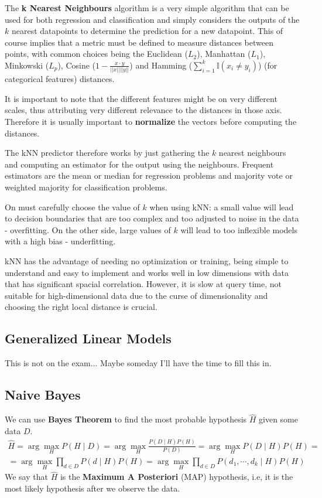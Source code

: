 \documentclass{article}
\begin{document}
The \textbf{k Nearest Neighbours} algorithm is a very simple algorithm that can be used for both regression and classification and simply considers the outputs of the $k$ nearest datapoints to determine the prediction for a new datapoint.
This of course implies that a metric must be defined to measure distances between points, with common choices being the Euclidean ($L_2$), Manhattan ($L_1$), Minkowski ($L_p$), Cosine ($1 - \frac{x \cdot y}{||x|| ||y||}$) and Hamming ($\sum_{i=1}^k \mathbb{I}(x_i \neq y_i)$) (for categorical features) distances.

It is important to note that the different features might be on very different scales, thus attributing very different relevance to the distances in those axis.
Therefore it is usually important to \textbf{normalize} the vectors before computing the distances.

The kNN predictor therefore works by just gathering the $k$ nearest neighbours and computing an estimator for the output using the neighbours.
Frequent estimators are the mean or median for regression problems and majority vote or weighted majority for classification problems.

On must carefully choose the value of $k$ when using kNN: a small value will lead to decision boundaries that are too complex and too adjusted to noise in the data - overfitting.
On the other side, large values of $k$ will lead to too inflexible models with a high bias - underfitting.

kNN has the advantage of needing no optimization or training, being simple to understand and easy to implement and works well in low dimensions with data that has significant spacial correlation.
However, it is slow at query time, not suitable for high-dimensional data due to the curse of dimensionality and choosing the right local distance is crucial.

\subsection{Generalized Linear Models}

This is not on the exam... Maybe someday I'll have the time to fill this in.

\subsection{Naive Bayes}

We can use \textbf{Bayes Theorem} to find the most probable hypothesis $\hat{H}$ given some data $D$.
\begin{gather*}
\hat{H} = \arg \max_{H} P(H \mid D) = \arg \max_{H} \frac{P(D \mid H)P(H)}{P(D)} = \arg \max_{H} P(D \mid H)P(H) = \\
= \arg \max_{H} \prod_{d \in D} P(d \mid H)P(H) = \arg \max_{H} \prod_{d \in D} P(d_1, \cdots, d_k \mid H)P(H)
\end{gather*}
We say that $\hat{H}$ is the \textbf{Maximum A Posteriori} (MAP) hypothesis, i.e, it is the most likely hypothesis after we observe the data.
\end{document}
